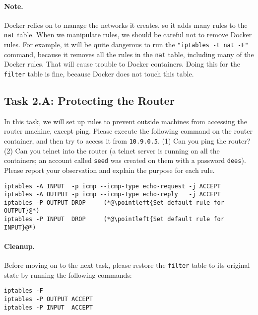 \paragraph{Note.} Docker relies on \iptables to manage 
the networks it creates, so it adds many rules to 
the \texttt{nat} table. 
When we manipulate \iptables rules, we should be careful 
not to remove Docker rules. For example, it will be quite
dangerous to run the \texttt{"iptables -t nat -F"} command, because 
it removes all the rules in the \texttt{nat} table,
including many of the Docker rules. That will cause 
trouble to Docker containers. Doing this for 
the \texttt{filter} table is fine, because Docker 
does not touch this table. 


\subsection{Task 2.A: Protecting the Router} 

In this task, we will set up rules to prevent outside machines from 
accessing the router machine, except ping.   
Please execute the following \iptables
command on the router container, and then try to 
access it from \texttt{10.9.0.5}. (1) Can you ping 
the router? (2) Can you telnet into the router (a 
telnet server is running on all the containers; an
account called \texttt{seed} was created on them with
a password \texttt{dees}). 
Please report your observation and explain the purpose for 
each rule. 

\begin{lstlisting}
iptables -A INPUT  -p icmp --icmp-type echo-request -j ACCEPT
iptables -A OUTPUT -p icmp --icmp-type echo-reply   -j ACCEPT
iptables -P OUTPUT DROP     (*@\pointleft{Set default rule for OUTPUT}@*)
iptables -P INPUT  DROP     (*@\pointleft{Set default rule for INPUT}@*)
\end{lstlisting}
 

\paragraph{Cleanup.} 
Before moving on to the next task, please restore the \texttt{filter} 
table to its original state by running the following commands:

\begin{lstlisting}
iptables -F
iptables -P OUTPUT ACCEPT
iptables -P INPUT  ACCEPT
\end{lstlisting}
 
